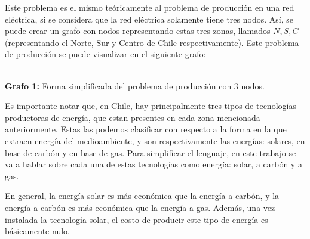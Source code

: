 \documentclass[12pt,twoside]{article}
\begin{document}
	\hspace{1cm} Este problema es el mismo te\'oricamente al problema de producci\'on en una red el\'ectrica, si se considera que la red el\'ectrica solamente tiene tres nodos. As\'i, se puede crear un grafo con nodos representando estas tres zonas, llamados \(N,S,C\) (representando el Norte, Sur y Centro de Chile respectivamente). Este problema de producci\'on se puede visualizar en el siguiente grafo:
	
	\begin{center}
		 \\
		\textbf{Grafo 1:} Forma simplificada del problema de producci\'on con 3 nodos.
	\end{center}
	
	\hspace{1cm} Es importante notar que, en Chile, hay principalmente tres tipos de tecnolog\'ias productoras de energ\'ia, que estan presentes en cada zona mencionada anteriormente. Estas las podemos clasificar con respecto a la forma en la que extraen energ\'ia del medioambiente, y son respectivamente las energ\'ias: solares, en base de carb\'on y en base de gas. Para simplificar el lenguaje, en este trabajo se va a hablar sobre cada una de estas tecnolog\'ias como energ\'ia: solar, a carb\'on y a gas.
	
	\hspace{1cm} En general, la energ\'ia solar es m\'as econ\'omica que la energ\'ia a carb\'on, y la energ\'ia a carb\'on es m\'as econ\'omica que la energ\'ia a gas. Adem\'as, una vez instalada la tecnolog\'ia solar, el costo de producir este tipo de energ\'ia es b\'asicamente nulo.
	
\end{document}

